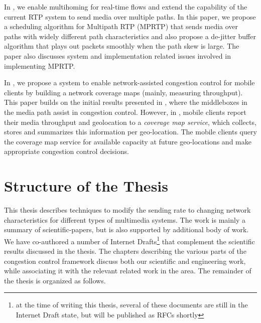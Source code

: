 In , we enable multihoming for real-time flows and extend the
capability of the current RTP system to send media over multiple paths. In
this paper, we propose a scheduling algorithm for Multipath RTP (MPRTP) that
sends media over paths with widely different path characteristics and also
propose a de-jitter buffer algorithm that plays out packets smoothly when the
path skew is large. The paper also discusses system and implementation related
issues involved in implementing MPRTP.

In , we propose a system to enable network-assisted
congestion control for mobile clients by building a network coverage maps
(mainly, measuring throughput). This paper builds on the initial results
presented in , where the middleboxes in the media path assist
in congestion control. However, in , mobile clients report
their media throughput and geolocation to a \emph{coverage map service}, which
collects, stores and summarizes this information per geo-location. The mobile
clients query the coverage map service for available capacity at future
geo-locations and make appropriate congestion control decisions.

\section{Structure of the Thesis}

This thesis describes techniques to modify the sending rate to changing
network characteristics for different types of multimedia systems. The work is
mainly a summary of scientific-papers, but is also supported by additional
body of work. We have co-authored a number of Internet Drafts\footnote{at the
time of writing this thesis, several of these documents are still in the
Internet Draft state, but will be published as RFCs shortly} that complement
the scientific results discussed in the thesis. The chapters describing the
various parts of the congestion control framework discuss both our scientific
and engineering work, while associating it with the relevant related work in
the area. The remainder of the thesis is organized as follows.


